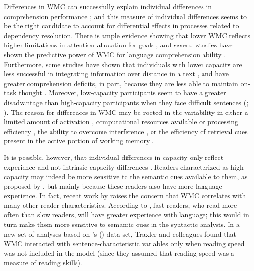 \documentclass{frontiersSCNS}\usepackage{knitr}
\newcommand{\posscitet}[1]{\citeauthor{#1}'s (\citeyear{#1})}
\begin{document}
Differences in WMC can successfully explain individual differences in comprehension performance \citep{DanemanCarpenter1980}; and this measure of individual differences seems to be the right candidate to account for differential effects in processes related to dependency resolution. There is ample evidence showing that lower WMC reflects higher limitations in attention allocation for goals \citep{Engle2002}, and several studies have shown the predictive power of WMC  for language comprehension ability \citep[for a meta-analysis of 77 studies till the mid-nineties:][]{DanemanMerikle1996}. 
Furthermore,  some studies have shown that individuals with lower capacity are less successful in integrating information over distance in a text \citep{DanemanCarpenter1980,YuillEtAl1989}, and have greater comprehension deficits, in part, because they are less able to maintain on-task thought  \citep{McVayKane2011}. Moreover, low-capacity participants seem to have a greater disadvantage than high-capacity participants when they face  difficult sentences (\citealp[for garden-path vs.\ non-garden path sentences:][]{ChristiansonWilliams2006}; \citealp[ for comprehension reaction times in subject- vs.\ object-relative clauses:][]{KingJust1991,VosEtAl2001b}). The reason for differences in  WMC may be rooted in the variability  in either a limited amount of activation \citep{JustCarpenter1992,VanRijEtAl2013},  computational resources available or processing efficiency \citep[among others:][]{DanemanCarpenter1980,DanemanCarpenter1983}, the ability to overcome interference \citep{HasherZacks1988,UnsworthEngle2007}, or the efficiency of retrieval cues present in the active portion of working memory \citep{EricssonKintsch1995}.

It is possible, however, that individual differences in capacity only reflect experience and not intrinsic capacity differences \citep{MacDonaldChristiansen2002,WellsEtAl2009}. Readers characterized as high-capacity may indeed be more sensitive to the semantic cues available to them, as proposed by \citet{PearlmutterMacDonald1995}, but mainly because these readers also have more language experience. In fact, recent work by \citet{TraxlerEtAl2012} raises the  concern that WMC correlates with many other reader characteristics. According to \citeauthor{TraxlerEtAl2012}, 
fast readers, who read more often than slow readers, will have greater experience with language; this would in turn make them more sensitive to semantic cues in the syntactic analysis.  In a new set of analyses based on \posscitet{TraxlerEtAl2005} data set, Traxler and colleagues found that WMC interacted with sentence-characteristic variables only when reading speed was not included in the model (since they assumed that reading speed was a measure of reading skills).  
\end{document}
